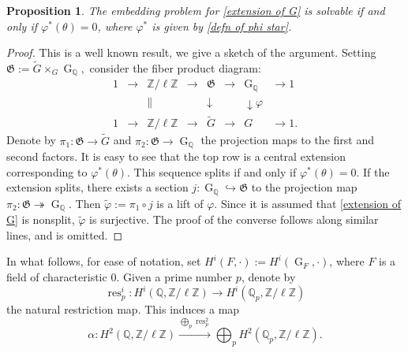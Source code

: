 \documentclass[11pt,reqno]{amsart}
\newtheorem{proposition}[theorem]{Proposition}
\newcommand{\Z}{\mathbb{Z}}
\newcommand{\Q}{\mathbb{Q}}
\newcommand{\op}[1]{\operatorname{#1}}
\numberwithin{equation}{section}
\begin{document}
\begin{proposition}\label{global lift existence criterion}
    The embedding problem for \eqref{extension of G} is solvable if and only if \( \varphi^*(\theta) = 0 \), where $\varphi^*$ is given by \eqref{defn of phi star}.
\end{proposition}  
\begin{proof}
This is a well known result, we give a sketch of the argument. Setting \(\mathfrak{G}:= \widetilde{G} \times_G \op{G}_{\Q},\) consider the fiber product diagram:
\[
\begin{array}{cccccccc}
1 & \to & \Z/\ell\Z & \to & \mathfrak{G} & \rightarrow & \op{G}_{\Q} & \to 1 \\
& & \| & & \downarrow & & \downarrow{\varphi} & \\
1 & \to & \Z/\ell \Z & \to & \widetilde{G} & \rightarrow & G & \to 1.
\end{array}
\]
Denote by $\pi_1:\mathfrak{G}\rightarrow \widetilde{G}$ and $\pi_2:\mathfrak{G}\rightarrow \op{G}_{\Q}$ the projection maps to the first and second factors. It is easy to see that the top row is a central extension corresponding to \( \varphi^*(\theta) \). This sequence splits if and only if \( \varphi^*(\theta) = 0 \). If the extension splits, there exists a section \( j: \op{G}_{\Q} \hookrightarrow \mathfrak{G}\) to the projection map $\pi_2: \mathfrak{G}\twoheadrightarrow \op{G}_{\Q}$. Then \( \widetilde{\varphi}:= \pi_1 \circ j\) is a lift of $\varphi$. Since it is assumed that \eqref{extension of G} is nonsplit, $\widetilde{\varphi}$ is surjective. The proof of the converse follows along similar lines, and is omitted.
\end{proof}
In what follows, for ease of notation, set $H^i(F, \cdot):=H^i(\op{G}_F, \cdot)$, where $F$ is a field of characteristic $0$. Given a prime number $p$, denote by
\[\op{res}^i_p: H^i(\Q, \Z/\ell\Z)\longrightarrow H^i(\Q_p, \Z/\ell\Z)\] the natural restriction map. This induces a map 
\[\alpha: H^2(\Q, \Z/\ell \Z)\xrightarrow{\bigoplus_p \op{res}_p^2} \bigoplus_{p} H^2(\Q_p, \Z/\ell \Z).\]
\end{document}
